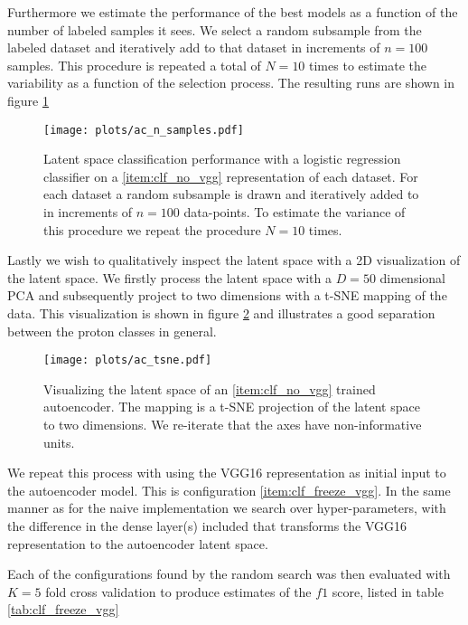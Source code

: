 \noindent Furthermore we estimate the performance of the best models as a function of the number of labeled samples it sees. We select a random subsample from the labeled dataset and iteratively add to that dataset in increments of $n=100$ samples. This procedure is repeated a total of $N=10$ times to estimate the variability as a function of the selection process. The resulting runs are shown in figure \ref{fig:ac_n_labeled}

\begin{figure}
\centering
\texttt{[image: plots/ac\_n\_samples.pdf]}
\caption[Autoencoder performance on labeled subsets]{Latent space classification performance with a logistic regression classifier on a \ref{item:clf_no_vgg} representation of each dataset. For each dataset a random subsample is drawn and iteratively added to in increments of $n=100$ data-points. To estimate the variance of this procedure we repeat the procedure $N=10$ times.}\label{fig:ac_n_labeled}
\end{figure}

\noindent Lastly we wish to qualitatively inspect the latent space with a 2D visualization of the latent space. We firstly process the latent space with a $D=50$ dimensional PCA and subsequently project to two dimensions with a t-SNE mapping of the data. This visualization is shown in figure \ref{fig:ac_tnse} and illustrates a good separation between the proton classes in general. 

\begin{figure}
\centering
\texttt{[image: plots/ac\_tsne.pdf]}
\caption[autoencoder latent space visualization]{Visualizing the latent space of an \ref{item:clf_no_vgg} trained autoencoder. The mapping is a t-SNE projection of the latent space to two dimensions. We re-iterate that the axes have non-informative units.}\label{fig:ac_tnse}
\end{figure}

We repeat this process with using the VGG16 representation as initial input to the autoencoder model. This is configuration \ref{item:clf_freeze_vgg}. In the same manner as for the naive implementation we search over hyper-parameters, with the difference in the dense layer(s) included that transforms the VGG16 representation to the autoencoder latent space.

Each of the configurations found by the random search was then evaluated with $K=5$ fold cross validation to produce estimates of the $f1$ score, listed in table \ref{tab:clf_freeze_vgg}

